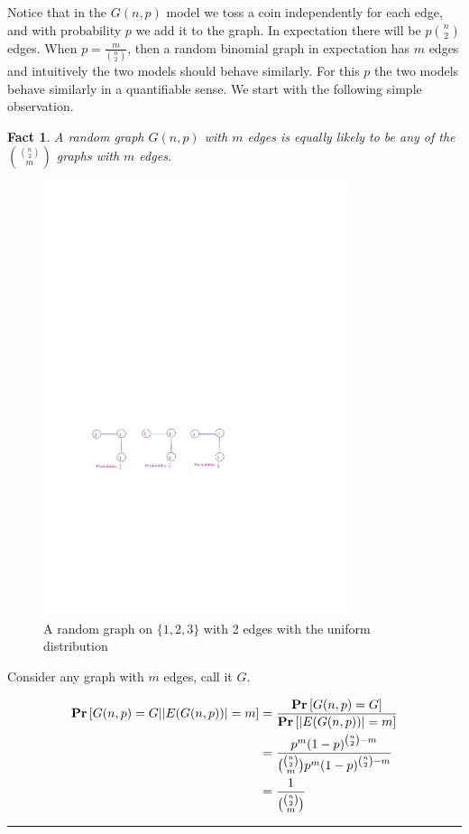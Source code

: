 \documentclass[twoside]{article}
\newtheorem{fact}[theorem]{Fact}
\newenvironment{proof}{{\bf Proof:}}{\hfill\rule{2mm}{2mm}}
\newcommand{\Prob}[1]{{{\bf{Pr}}\left[{#1}\right]}}
\begin{document}
\noindent Notice that in the $G(n,p)$ model we toss a coin independently for each edge, 
and with probability $p$ we add it to the graph. 
In expectation there will be $p{n \choose 2}$ edges.  When $p=\frac{m}{{n \choose 2}}$,
then a random binomial graph in expectation has $m$ edges and intuitively the two models should 
behave similarly. For this $p$ the two models behave similarly in a quantifiable sense.
We start with the following simple observation. 


\begin{fact}
A random graph $G(n,p)$ with $m$ edges is equally likely to be any of the ${{n \choose 2} \choose m}$ 
graphs with $m$ edges. 
\end{fact}


\begin{figure}
\centering
\includegraphics[width=0.8\textwidth]{FIG/random-graph-example} 
\caption{\label{fig:examplerandom} A random graph on $\{1,2,3\}$ with 2 edges with the uniform distribution}
\end{figure}

\begin{proof}

Consider any graph with $m$ edges, call it $G$. 


\begin{align*} 
\Prob{ G(n,p) = G | |E(G(n,p))|=m} &= \frac{ \Prob{G(n,p)=G} }{\Prob{|E(G(n,p))|=m}} \\ 
                                   &=  \frac{ p^m (1-p)^{    {n \choose 2} - m   }  }{ { {n \choose 2} \choose m } p^m (1-p)^{   {n \choose 2} - m } } \\ 
								   &= \frac{1}{{ {n \choose 2} \choose m }}
\end{align*} 


\end{proof}
\end{document}

